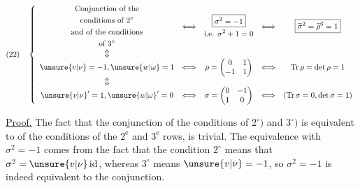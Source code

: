\[
(22)\quad
\left\{
\begin{array}{ccccc}
\begin{gathered}
\text{Conjunction of the}\\
\text{conditions of }2^\circ\\
\text{and of the conditions}\\
\text{of }3^\circ
\end{gathered}
&\Longleftrightarrow&
\begin{gathered}\boxed{\sigma^2=-1}\\
\text{i.e. }\sigma^2+1=0\end{gathered}
&\Longleftrightarrow&
\boxed{\widetilde\sigma^2=\widetilde\rho^3=1}
\\
\Updownarrow&&&&\\
\unsure{v|\nu}=-1,\unsure{w|\omega}=1&\Longleftrightarrow&
\rho=\begin{pmatrix}0&1\\-1&1\end{pmatrix}
&\Longleftrightarrow&\operatorname{Tr}\rho=\det\rho=1
\\
\Updownarrow&&&&\\
\unsure{v|\nu}'=1,\unsure{w|\omega}'=0&\Longleftrightarrow&
\sigma=\begin{pmatrix}0&-1\\1&0\end{pmatrix}
&\Longleftrightarrow&(\operatorname{Tr}\sigma=0,\det\sigma=1)
\end{array}\right.
\]

\uline{Proof.} The fact that the conjunction of the conditions of $2^\circ)$ and $3^\circ)$ is equivalent to  of the conditions of the $2^{\mathrm e}$ and $3^{\mathrm e}$ rows, is trivial. The equivalence with $\sigma^2=-1$ comes from the fact that  the condition $2^\circ$ means that  $\sigma^2=\unsure{v|\nu}\,\mathrm{id}$,  whereas $3^\circ$ means $\unsure{v|\nu}=-1$, so $\sigma^2=-1$ is indeed equivalent to the conjunction.

